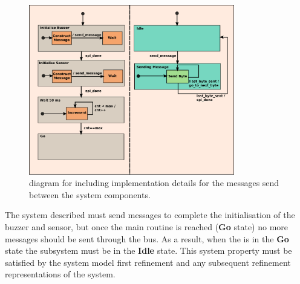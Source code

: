 \begin{figure}[!tbp]
  \begin{centering}
  \includegraphics[width=0.8\textwidth]{figures/ASIC&SPI_2}
  \caption{\Statechart diagram for \IDS including implementation details for the messages send between the system components.}
  \label{fig:ASIC_SPI_2}
  \end{centering}
\end{figure} 

The system described must send messages to complete the initialisation of the buzzer and sensor, but once the main routine is reached (\textbf{Go} state) no more messages should be sent through the \SPI bus. As a result, when the \ASIC is in the \textbf{Go} state the \SPI subsystem must be in the \textbf{Idle} state. This system property must be satisfied by the system model first refinement and any subsequent refinement representations of the system.




